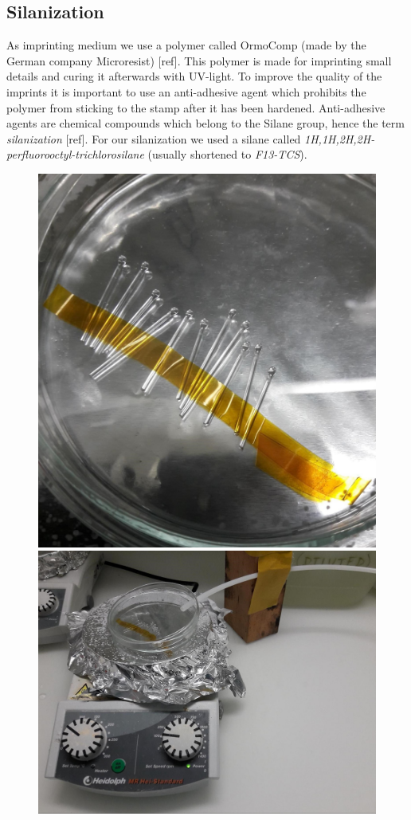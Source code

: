 \subsection{Silanization}
As imprinting medium we use a polymer called OrmoComp (made by the German company Microresist) [ref]. This polymer is made for imprinting small details and curing it afterwards with UV-light. To improve the quality of the imprints it is important to use an anti-adhesive agent which prohibits the polymer from sticking to the stamp after it has been hardened. Anti-adhesive agents are chemical compounds which belong to the Silane group, hence the term \textit{silanization} [ref]. For our silanization we used a silane called \textit{1H,1H,2H,2H-perfluorooctyl-trichlorosilane} (usually shortened to \textit{F13-TCS}).
\begin{figure}[H]
	\includegraphics[scale=0.1]{source/stamps_taped}
	\includegraphics[scale=0.14]{source/silanization}

\end{figure}

